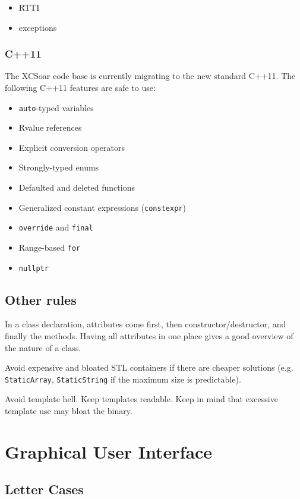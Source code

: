 \documentclass[a4paper,12pt]{refrep}
\begin{document}
\begin{itemize}
\item RTTI
\item exceptions
\end{itemize}

\subsubsection{C++11}

The XCSoar code base is currently migrating to the new standard
C++11.  The following C++11 features are safe to use:

\begin{itemize}
\item \verb|auto|-typed variables
\item Rvalue references
\item Explicit conversion operators
\item Strongly-typed enums
\item Defaulted and deleted functions
\item Generalized constant expressions (\verb|constexpr|)
\item \verb|override| and \verb|final|
\item Range-based \verb|for|
\item \verb|nullptr|
\end{itemize}

\subsection{Other rules}

In a class declaration, attributes come first, then
constructor/destructor, and finally the methods.  Having all
attributes in one place gives a good overview of the nature of a
class.

Avoid expensive and bloated STL containers if there are cheaper
solutions (e.g. \texttt{StaticArray}, \texttt{StaticString} if the
maximum size is predictable).

Avoid template hell.  Keep templates readable.  Keep in mind that
excessive template use may bloat the binary.

\section{Graphical User Interface}
\subsection{Letter Cases}
\end{document}
